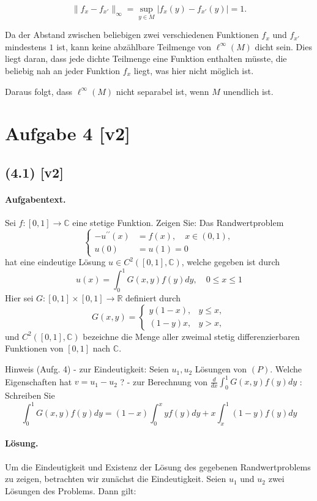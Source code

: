 \documentclass[11pt,a4paper]{article}
\begin{document}
\[
\|f_x - f_{x'}\|_{\infty} = \sup_{y \in M} |f_x(y) - f_{x'}(y)| = 1.
\]

Da der Abstand zwischen beliebigen zwei verschiedenen Funktionen $f_x$ und $f_{x'}$ mindestens $1$ ist, kann keine abzählbare Teilmenge von $\ell^{\infty}(M)$ dicht sein. Dies liegt daran, dass jede dichte Teilmenge eine Funktion enthalten müsste, die beliebig nah an jeder Funktion $f_x$ liegt, was hier nicht möglich ist.

Daraus folgt, dass $\ell^{\infty}(M)$ nicht separabel ist, wenn $M$ unendlich ist.


\section*{Aufgabe 4 [v2]}
\subsection*{(4.1) [v2]}
\paragraph{Aufgabentext.}
Sei $f:[0,1] \rightarrow \mathbb{C}$ eine stetige Funktion. Zeigen Sie: Das Randwertproblem
$$
\left\{\begin{aligned}
-u^{\prime \prime}(x) & =f(x), \quad x \in(0,1), \\
u(0) & =u(1)=0
\end{aligned}\right.
$$
hat eine eindeutige Lösung $u \in C^2([0,1], \mathbb{C})$, welche gegeben ist durch
$$
u(x)=\int_0^1 G(x, y) f(y) d y, \quad 0 \leq x \leq 1
$$
Hier sei $G:[0,1] \times[0,1] \rightarrow \mathbb{R}$ definiert durch
$$
G(x, y)= \begin{cases}y(1-x), & y \leq x, \\ (1-y) x, & y>x,\end{cases}
$$
und $C^2([0,1], \mathbb{C})$ bezeichne die Menge aller zweimal stetig differenzierbaren Funktionen von $[0,1]$ nach $\mathbb{C}$.

Hinweis (Aufg. 4)
- zur Eindeutigkeit: Seien $u_1, u_2$ Lösungen von $(P)$. Welche Eigenschaften hat $v=u_1-u_2$ ?
- zur Berechnung von $\frac{d}{d x} \int_0^1 G(x, y) f(y) d y$ : Schreiben Sie
$$
\int_0^1 G(x, y) f(y) d y=(1-x) \int_0^x y f(y) d y+x \int_x^1(1-y) f(y) d y
$$

\paragraph{Lösung.}
Um die Eindeutigkeit und Existenz der Lösung des gegebenen Randwertproblems zu zeigen, betrachten wir zunächst die Eindeutigkeit. Seien \( u_1 \) und \( u_2 \) zwei Lösungen des Problems. Dann gilt:
\end{document}

